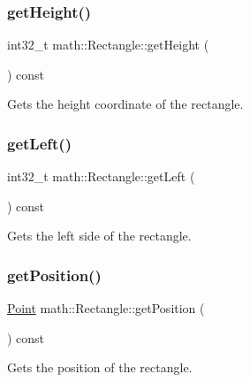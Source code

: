 \subsubsection{\texorpdfstring{getHeight()}{getHeight()}}
{\footnotesize\ttfamily int32\+\_\+t math\+::\+Rectangle\+::get\+Height (\begin{DoxyParamCaption}{ }\end{DoxyParamCaption}) const\hspace{0.3cm}{\ttfamily [inline]}}



Gets the height coordinate of the rectangle. 

\mbox{\label{structmath_1_1_rectangle_a6bb859d2cbe0f997d9ff45e52cdf5078}} 
\subsubsection{\texorpdfstring{getLeft()}{getLeft()}}
{\footnotesize\ttfamily int32\+\_\+t math\+::\+Rectangle\+::get\+Left (\begin{DoxyParamCaption}{ }\end{DoxyParamCaption}) const\hspace{0.3cm}{\ttfamily [inline]}}



Gets the left side of the rectangle. 

\mbox{\label{structmath_1_1_rectangle_af1d65a3a3eb6862f4038e29f8e9e5c93}} 
\subsubsection{\texorpdfstring{getPosition()}{getPosition()}}
{\footnotesize\ttfamily \mbox{\hyperlink{struct_point}{Point}} math\+::\+Rectangle\+::get\+Position (\begin{DoxyParamCaption}{ }\end{DoxyParamCaption}) const\hspace{0.3cm}{\ttfamily [inline]}}



Gets the position of the rectangle. 

\mbox{\label{structmath_1_1_rectangle_a510cbe314842f09d09310548a93ca9ed}} 
